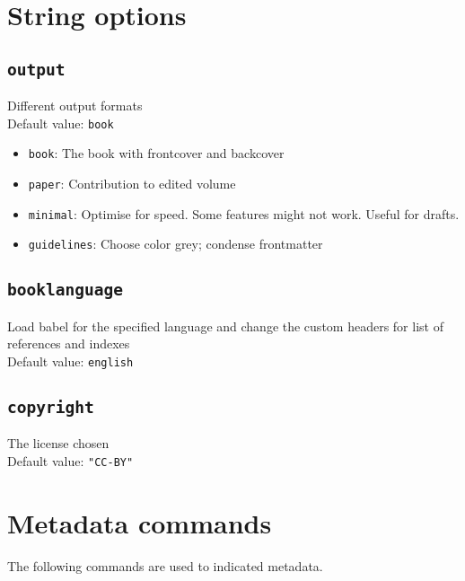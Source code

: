 \documentclass[%
output=guidelines,guidelines]{../langscibook}
\newcommand{\option}[3]{\subsection{\texttt{#1}}{#2}\\Default value: {\texttt{#3}}}
\begin{document}
\section{String options}
\option{output}{Different output formats}{book}
\begin{itemize}
\item \texttt{book}: The book with frontcover and backcover
\item \texttt{paper}: Contribution to edited volume
\item \texttt{minimal}: Optimise for speed. Some features might not work. Useful for drafts.
\item \texttt{guidelines}: Choose color grey; condense frontmatter
\end{itemize}

\option{booklanguage}{Load babel for the specified language and change the custom headers for list of references and indexes}{english}
\option{copyright}{The license chosen}{"CC-BY"}



\section{Metadata commands}\label{sec:metadatacommands}
The following commands are used to indicated metadata.
\end{document}
